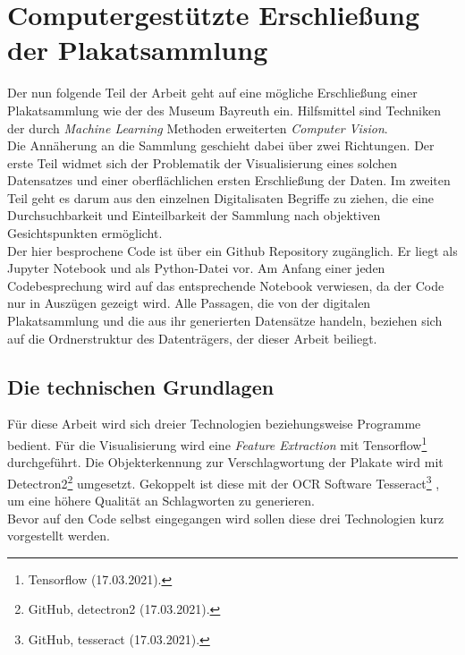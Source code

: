 \documentclass[a4paper,12pt,ngerman]{article}
\begin{document}
\section{Computergestützte Erschließung der Plakatsammlung}
Der nun folgende Teil der Arbeit geht auf eine mögliche Erschließung einer Plakatsammlung wie der des Museum Bayreuth ein. Hilfsmittel sind Techniken der durch \textit{Machine Learning} Methoden erweiterten \textit{Computer Vision}. \\
Die Annäherung an die Sammlung geschieht dabei über zwei Richtungen. Der erste Teil widmet sich der Problematik der Visualisierung eines solchen Datensatzes und einer oberflächlichen ersten Erschließung der Daten. Im zweiten Teil geht es darum aus den einzelnen Digitalisaten Begriffe zu ziehen, die eine Durchsuchbarkeit und Einteilbarkeit der Sammlung nach objektiven Gesichtspunkten ermöglicht. \\
Der hier besprochene Code ist über ein Github Repository zugänglich. Er liegt als Jupyter Notebook und als Python-Datei vor. Am Anfang einer jeden Codebesprechung wird auf das entsprechende Notebook verwiesen, da der Code nur in Auszügen gezeigt wird. Alle Passagen, die von der digitalen Plakatsammlung und die aus ihr generierten Datensätze handeln, beziehen sich auf die Ordnerstruktur des Datenträgers, der dieser Arbeit beiliegt. \\

\subsection{Die technischen Grundlagen}
Für diese Arbeit wird sich dreier Technologien beziehungsweise Programme bedient. Für die Visualisierung wird eine \textit{Feature Extraction} mit Tensorflow\footnote{Tensorflow (17.03.2021).}  durchgeführt. Die Objekterkennung zur Verschlagwortung der Plakate wird mit Detectron2\footnote{GitHub, detectron2 (17.03.2021).} umgesetzt. Gekoppelt ist diese mit der OCR Software Tesseract\footnote{GitHub, tesseract (17.03.2021).} , um eine höhere Qualität an Schlagworten zu generieren. \\
Bevor auf den Code selbst eingegangen wird sollen diese drei Technologien kurz vorgestellt werden. \\
\end{document}
